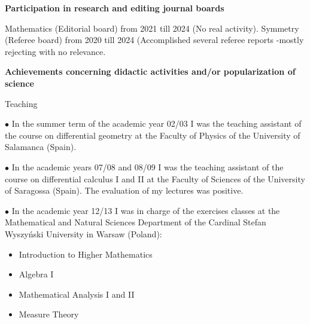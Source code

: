 \documentclass[12pt,reqno]{amsbook}
\begin{document}
\vskip 0.5cm
 
{\bf Participation in research and editing journal boards}
\vskip 0.5cm

Mathematics (Editorial board) from 2021 till 2024 (No real activity). Symmetry (Referee board) from 2020 till 2024 (Accomplished several referee reports -mostly rejecting with no relevance.
\vskip 0.5cm

%

\vskip 0.5cm

{\bf Achievements concerning didactic activities and/or popularization of science }

\centerline{Teaching}
\vskip 0.5cm
$\bullet$ In the summer term of the academic year 02/03 I was the teaching assistant of the course on differential geometry at the Faculty of Physics of the University of Salamanca (Spain).

$\bullet$ In the academic years 07/08 and 08/09 I was the teaching assistant of the course on differential calculus I and II at the Faculty of Sciences of the University of Saragossa (Spain). The evaluation of my lectures was positive.

$\bullet$ In the academic year 12/13 I was in charge of the exercises classes at the Mathematical and Natural Sciences Department of the Cardinal Stefan Wyszy\'nski University in Warsaw (Poland):

\begin{itemize}
\item Introduction to Higher Mathematics
\item Algebra I
\item Mathematical Analysis I and II
\item Measure Theory
\end{itemize}
\end{document}
